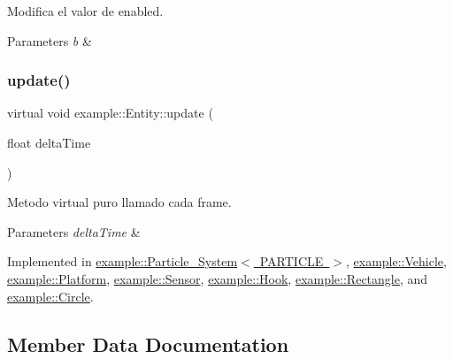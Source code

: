 Modifica el valor de enabled. 


\begin{DoxyParams}{Parameters}
{\em b} & \\
\hline
\end{DoxyParams}
\mbox{\label{classexample_1_1_entity_a5dded5c361451f2cfdf7ed3c7de1194f}} 
\subsubsection{\texorpdfstring{update()}{update()}}
{\footnotesize\ttfamily virtual void example\+::\+Entity\+::update (\begin{DoxyParamCaption}\item[{float}]{delta\+Time }\end{DoxyParamCaption})\hspace{0.3cm}{\ttfamily [pure virtual]}}



Metodo virtual puro llamado cada frame. 


\begin{DoxyParams}{Parameters}
{\em delta\+Time} & \\
\hline
\end{DoxyParams}


Implemented in \mbox{\hyperlink{classexample_1_1_particle___system_a28602cfbbff3c7762da1ccbc7324f8f8}{example\+::\+Particle\+\_\+\+System$<$ P\+A\+R\+T\+I\+C\+L\+E $>$}}, \mbox{\hyperlink{classexample_1_1_vehicle_a6fcb41bf4274c7bbc1fb0957b770d65a}{example\+::\+Vehicle}}, \mbox{\hyperlink{classexample_1_1_platform_a70a40dddbd963080b45d086f79c88b3e}{example\+::\+Platform}}, \mbox{\hyperlink{classexample_1_1_sensor_a6db61100875509315537c46418fbc250}{example\+::\+Sensor}}, \mbox{\hyperlink{classexample_1_1_hook_a23c335b2ccc707a1444109a849d8020e}{example\+::\+Hook}}, \mbox{\hyperlink{classexample_1_1_rectangle_a346951183565830ee4b262c8c66f2673}{example\+::\+Rectangle}}, and \mbox{\hyperlink{classexample_1_1_circle_a49dfe984ad6e169dae2a651d79951475}{example\+::\+Circle}}.



\subsection{Member Data Documentation}
\mbox{\label{classexample_1_1_entity_aa5cc086c278afb464fc8df85df9e51de}} 
